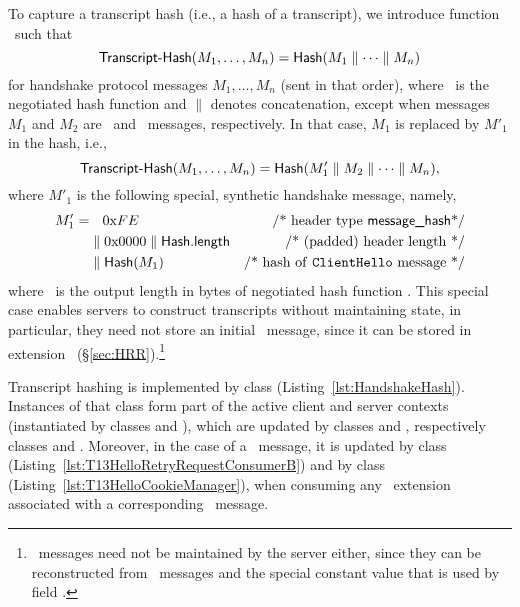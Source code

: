 To capture a transcript hash (i.e., a hash of a transcript), 
we introduce function \TranscriptHash\ such that
%
\[
  \textsf{Transcript-Hash}(M_1,\dots,M_n) = \textsf{Hash}(M_1 \parallel \dots \parallel M_n)
\]
%
for handshake protocol messages $M_1,\dots,M_n$ (sent in that order), where \Hash\ is the 
negotiated hash function and $\parallel$ denotes concatenation, except when 
messages $M_1$ and $M_2$ are \ClientHello\ and \HelloRetryRequest\ messages, 
respectively. In that case, $M_1$ is replaced by $M'_1$ in the hash, i.e., 
%
\[
  \textsf{Transcript-Hash}(M_1,\dots,M_n) = \textsf{Hash}(M'_1 \parallel M_2 \parallel \dots \parallel M_n),
\]
where $M'_1$ is the following special, synthetic handshake message, 
namely, \ifSpecNotes{}\fi
%
\begin{align*}
  M'_1 = 
    & \mathbin{\phantom{\parallel}}  0\textrm{x}FE &\textrm{/* header type \textsf{message\_hash}*/}     \\
    & \parallel                      0\textrm{x}0000 \parallel \textsf{Hash}\textsf{.length} &\textrm{/* (padded) header length */} \\
    & \parallel                      \textsf{Hash}(M_1) &\textrm{/* hash of \texttt{ClientHello}\ message */}
\end{align*}
%
where \HashLength\ is the output length in bytes of negotiated hash function \Hash.
This special case enables servers to construct transcripts without maintaining 
state, in particular, they need not store an initial \ClientHello\ message,
since it can be stored in extension \TLScookie\ (\S\ref{sec:HRR}).\footnote{%
  \HelloRetryRequest\ messages need not be maintained by the server either, since
  they can be reconstructed from \ClientHello\ messages and the special constant
  value that is used by field \HelloRetryRequest{}\TLSrandom.}

\begin{tcolorbox}
Transcript hashing is implemented by class  (Listing~\ref{lst:HandshakeHash}).
Instances of that class form part of the active client and server contexts (instantiated by classes 
 and ), which are updated by classes 
 and , respectively classes 
 and . Moreover, in the case 
of a \HelloRetryRequest\ message, it is updated by class 
 (Listing~\ref{lst:T13HelloRetryRequestConsumerB})
and by class  (Listing~\ref{lst:T13HelloCookieManager}), when consuming any 
\TLScookie\ extension associated with a corresponding \ClientHello\ message.
\end{tcolorbox}

